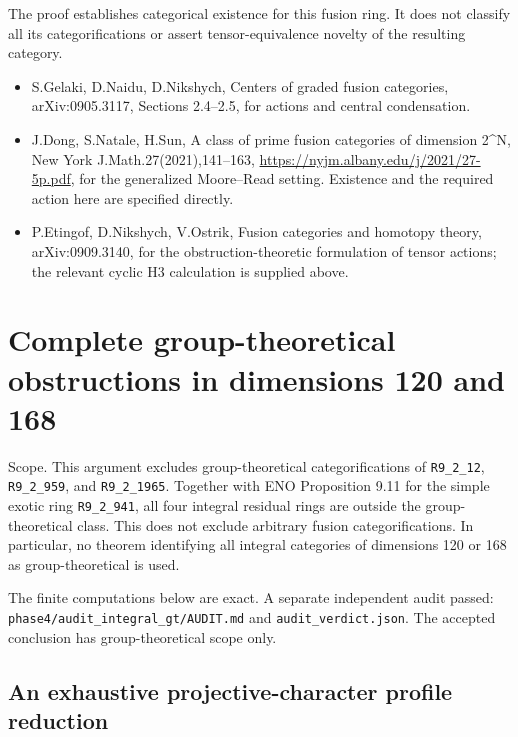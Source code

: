 The proof establishes categorical existence for this fusion ring. It
does not classify all its categorifications or assert tensor-equivalence
novelty of the resulting category.

\begin{itemize}
\tightlist
\item
  S.Gelaki, D.Naidu, D.Nikshych, Centers of graded fusion categories,
  arXiv:0905.3117, Sections 2.4--2.5, for actions and central
  condensation.
\item
  J.Dong, S.Natale, H.Sun, A class of prime fusion categories of
  dimension 2\^{}N, New York J.Math.27(2021),141--163,
  \url{https://nyjm.albany.edu/j/2021/27-5p.pdf}, for the generalized
  Moore--Read setting. Existence and the required action here are
  specified directly.
\item
  P.Etingof, D.Nikshych, V.Ostrik, Fusion categories and homotopy
  theory, arXiv:0909.3140, for the obstruction-theoretic formulation of
  tensor actions; the relevant cyclic H3 calculation is supplied above.
\end{itemize}

\hypertarget{complete-group-theoretical-obstructions-in-dimensions-120-and-168}{%
\section{Complete group-theoretical obstructions in dimensions 120 and
168}\label{complete-group-theoretical-obstructions-in-dimensions-120-and-168}}

Scope. This argument excludes group-theoretical categorifications of
\texttt{R9\_\allowbreak{}2\_\allowbreak{}12},
\texttt{R9\_\allowbreak{}2\_\allowbreak{}959}, and
\texttt{R9\_\allowbreak{}2\_\allowbreak{}1965}. Together with ENO
Proposition 9.11 for the simple exotic ring
\texttt{R9\_\allowbreak{}2\_\allowbreak{}941}, all four integral
residual rings are outside the group-theoretical class. This does not
exclude arbitrary fusion categorifications. In particular, no theorem
identifying all integral categories of dimensions 120 or 168 as
group-theoretical is used.

The finite computations below are exact. A separate independent audit
passed:
\texttt{phase4\allowbreak{}/\allowbreak{}audit\_\allowbreak{}integr\allowbreak{}al\_\allowbreak{}gt/\allowbreak{}AUDIT.\allowbreak{}md}
and \texttt{audit\_\allowbreak{}verdic\allowbreak{}t.\allowbreak{}json}.
The accepted conclusion has group-theoretical scope only.

\hypertarget{an-exhaustive-projective-character-profile-reduction}{%
\subsection{An exhaustive projective-character profile
reduction}\label{an-exhaustive-projective-character-profile-reduction}}


